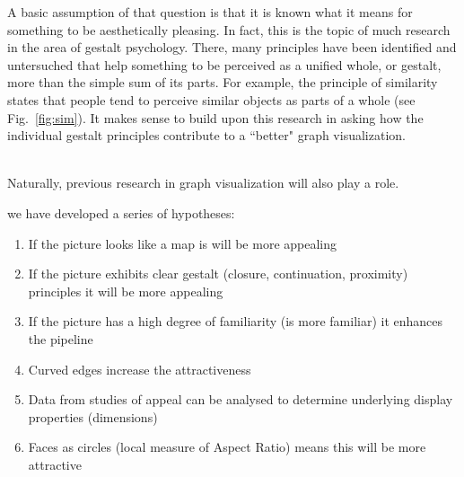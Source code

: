 \documentclass[12pt]{article}
\begin{document}
A basic assumption of that question is that it is known what it means for something to be aesthetically pleasing. 
In fact, this is the topic of much research in the area of gestalt psychology. 
There, many principles have been identified and untersuched that help something to be perceived as a unified whole, or gestalt, more than the simple sum of its parts. For example, the principle of similarity states that people tend to perceive similar objects as parts of a whole (see Fig.~\ref{fig:sim}). It makes sense to build upon this research in asking how the individual gestalt principles contribute to a ``better" graph visualization.

\\

Naturally, previous research in graph visualization will also play a role.



we have developed a series of hypotheses:
\begin{enumerate}[label=H\arabic*:]
	\item If the picture looks like a map is will be more appealing
	\item If the picture exhibits clear gestalt (closure, continuation, proximity) principles it will be more appealing
	\item If the picture has a high degree of familiarity (is more familiar) it enhances the pipeline
	\item Curved edges increase the attractiveness
	\item Data from studies of appeal can be analysed to determine underlying display properties (dimensions)
	\item Faces as circles (local measure of Aspect Ratio) means this will be more attractive
\end{enumerate}
\end{document}
